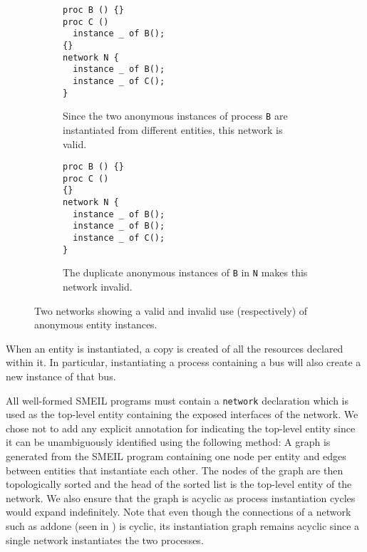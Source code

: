 \begin{figure}
  \centering
  \begin{subfigure}[t]{0.40\textwidth}
\begin{lstlisting}[language=smeil]
proc B () {}
proc C ()
  instance _ of B();
{}
network N {
  instance _ of B();
  instance _ of C();
}
\end{lstlisting}
    \caption{Since the two anonymous instances of process {\tt B} are
      instantiated from different entities, this network is valid.}
    \label{fig:ambigvalid}
    \hspace{4mm}
\end{subfigure}\hfill
\begin{subfigure}[t]{0.40\textwidth}
\begin{lstlisting}[language=smeil]
proc B () {}
proc C ()
{}
network N {
  instance _ of B();
  instance _ of B();
  instance _ of C();
}
\end{lstlisting}
    \caption{The duplicate anonymous instances of {\tt B} in {\tt N} makes this
      network invalid.}
  \end{subfigure}

  \caption{Two networks showing a valid and invalid use (respectively) of
  anonymous entity instances.}
\label{fig:anonproc}
\end{figure}

When an entity is instantiated, a copy is created of all the resources declared
within it. In particular, instantiating a process containing a bus will also
create a new instance of that bus.


All well-formed SMEIL programs must contain a {\tt network} declaration which is
used as the top-level entity containing the exposed interfaces of the
network. We chose not to add any explicit annotation for indicating the
top-level entity since it can be unambiguously identified using the following
method: A graph is generated from the SMEIL program containing one node per
entity and edges between entities that instantiate each other. The nodes of the
graph are then topologically sorted and the head of the sorted list is the
top-level entity of the network. We also ensure that the graph is acyclic as
process instantiation cycles would expand indefinitely. Note that even though
the connections of a network such as {\sc addone} (seen in ) is
cyclic, its instantiation graph remains acyclic since a single network
instantiates the two processes.

